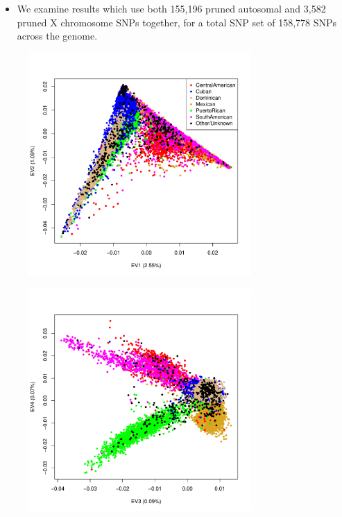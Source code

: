 \documentclass{beamer}
\begin{document}
\begin{frame}
\begin{itemize}
\item We examine results which use both 155,196 pruned autosomal and 3,582 pruned X chromosome SNPs together, for a total SNP set of 158,778 SNPs across the genome.
\end{itemize}
\end{frame}

\begin{frame}
\centering
\begin{figure}
\includegraphics[height=8.5cm]{../pca_autoX_ev12_col.pdf}
\end{figure}
\end{frame}

\begin{frame}
\centering
\begin{figure}
\includegraphics[height=8.5cm]{../pca_autoX_ev34_col.pdf}
\end{figure}
\end{frame}
\end{document}
